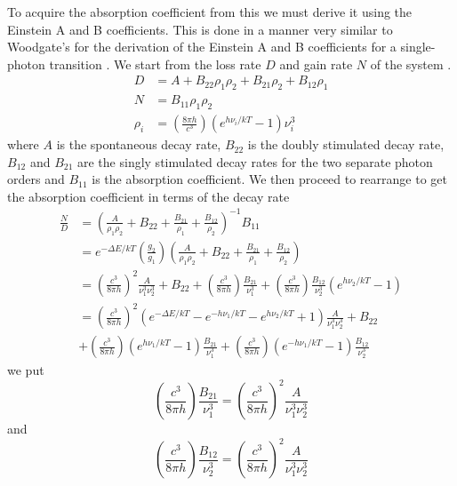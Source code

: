 To acquire the absorption coefficient from this we must derive it using the Einstein A and B coefficients. This is done in a manner very similar to Woodgate's for the derivation of the Einstein A and B coefficients for a single-photon transition \cite{woodgate1}. We start from the loss rate $D$ and gain rate $N$ of the system \cite{Dehli}.
\begin{equation}
    \begin{split}
        D&=A+B_{22}\rho_1\rho_2+B_{21}\rho_2+B_{12}\rho_1\\
        N&=B_{11}\rho_1\rho_2\\
        \rho_i&= \left(\frac{8\pi h}{c^3}\right)(e^{h\nu_i/kT}-1)\nu_i^3
    \end{split}
\end{equation}
where $A$ is the spontaneous decay rate, $B_{22}$ is the doubly stimulated decay rate, $B_{12}$ and $B_{21}$ are the singly stimulated decay rates for the two separate photon orders and $B_{11}$ is the absorption coefficient. We then proceed to rearrange to get the absorption coefficient in terms of the decay rate
\begin{equation}
    \begin{split}
        \frac{N}{D}&=\left(\frac{A}{\rho_1 \rho_2} +B_{22}+\frac{B_{21}}{\rho_1}+\frac{B_{12}}{\rho_2}\right)^{-1}B_{11}\\
        &=e^{-\Delta E/kT}\left(\frac{g_2}{g_1}\right)\left(\frac{A}{\rho_1 \rho_2} +B_{22}+\frac{B_{21}}{\rho_1}+\frac{B_{12}}{\rho_2}\right)\\
        &=\left(\frac{c^3}{8\pi h}\right)^2 \frac{A}{\nu_1 ^3 \nu_2^3}+B_{22}+
        \left(\frac{c^3}{8\pi h}\right)\frac{B_{21}}{\nu_1^3}+\left(\frac{c^3}{8\pi h}\right)\frac{B_{12}}{\nu_2^3}\left(e^{h\nu_2 /kT}-1\right)\\
        &=\left(\frac{c^3}{8\pi h}\right)^2\left(e^{-\Delta E/kT} -e^{-h\nu_1 /kT}-e^{h\nu_2 /kT}+1 \right) \frac{A}{\nu_1 ^3 \nu_2^3}+B_{22}\\
        &+\left(\frac{c^3}{8\pi h}\right) \left( e^{h\nu_1 /kT}-1\right)\frac{B_{21}}{\nu_1^3}+\left(\frac{c^3}{8\pi h}\right) \left( e^{-h\nu_1 /kT}-1\right)\frac{B_{12}}{\nu_2^3}
    \end{split}
\end{equation}
we put
\begin{equation}
    \left(\frac{c^3}{8\pi h}\right)\frac{B_{21}}{\nu_1^3} = 
    \left(\frac{c^3}{8\pi h}\right)^2 \frac{A}{\nu_1^3 \nu_2^3}
\end{equation}
and
\begin{equation}
  \left(\frac{c^3}{8\pi h}\right)\frac{B_{12}}{\nu_2^3} = 
    \left(\frac{c^3}{8\pi h}\right)^2 \frac{A}{\nu_1^3 \nu_2^3}  
\end{equation}
